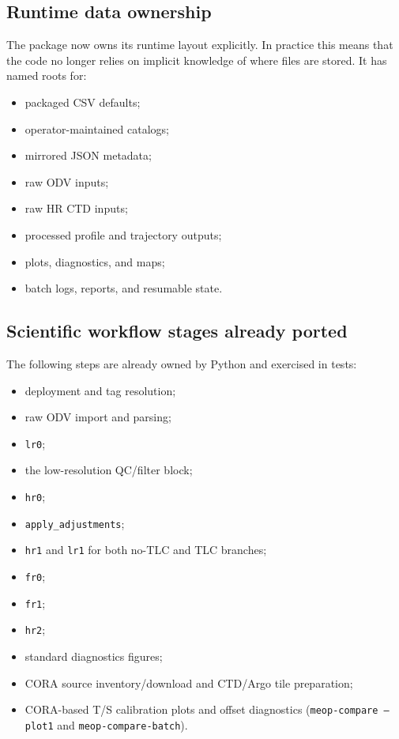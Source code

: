 \documentclass[11pt,a4paper]{article}
\newcommand{\pkg}[1]{\texttt{#1}}
\begin{document}
\subsection{Runtime data ownership}

The package now owns its runtime layout explicitly. In practice this means that the code no longer relies on implicit knowledge of where files are stored. It has named roots for:

\begin{itemize}[leftmargin=1.5em]
  \item packaged CSV defaults;
  \item operator-maintained catalogs;
  \item mirrored JSON metadata;
  \item raw ODV inputs;
  \item raw HR CTD inputs;
  \item processed profile and trajectory outputs;
  \item plots, diagnostics, and maps;
  \item batch logs, reports, and resumable state.
\end{itemize}

\subsection{Scientific workflow stages already ported}

The following steps are already owned by Python and exercised in tests:

\begin{itemize}[leftmargin=1.5em]
  \item deployment and tag resolution;
  \item raw ODV import and parsing;
  \item \pkg{lr0};
  \item the low-resolution QC/filter block;
  \item \pkg{hr0};
  \item \pkg{apply\_adjustments};
  \item \pkg{hr1} and \pkg{lr1} for both no-TLC and TLC branches;
  \item \pkg{fr0};
  \item \pkg{fr1};
  \item \pkg{hr2};
  \item standard diagnostics figures;
  \item CORA source inventory/download and CTD/Argo tile preparation;
  \item CORA-based T/S calibration plots and offset diagnostics
  (\pkg{meop-compare --plot1} and \pkg{meop-compare-batch}).
\end{itemize}
\end{document}
